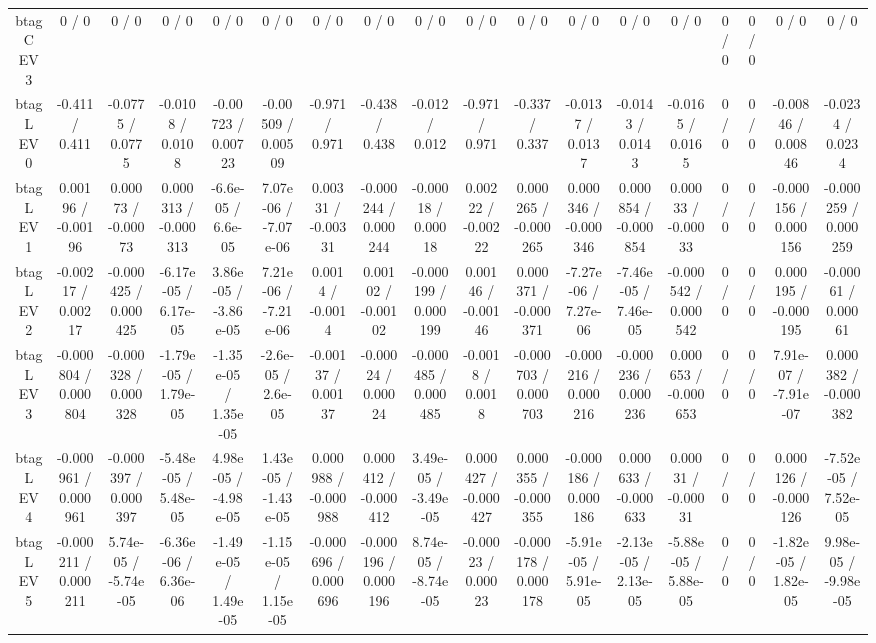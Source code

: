 \documentclass[10pt]{article}
\begin{document}
\begin{table}[htbp]
\begin{center}
\begin{tabular}{|c|c|c|c|c|c|c|c|c|c|c|c|c|c|c|c|c|c|}
  btag C EV 3 & 0 / 0 & 0 / 0 & 0 / 0 & 0 / 0 & 0 / 0 & 0 / 0 & 0 / 0 & 0 / 0 & 0 / 0 & 0 / 0 & 0 / 0 & 0 / 0 & 0 / 0 & 0 / 0 & 0 / 0 & 0 / 0 & 0 / 0 \\ 
  btag L EV 0 & -0.411 / 0.411 & -0.0775 / 0.0775 & -0.0108 / 0.0108 & -0.00723 / 0.00723 & -0.00509 / 0.00509 & -0.971 / 0.971 & -0.438 / 0.438 & -0.012 / 0.012 & -0.971 / 0.971 & -0.337 / 0.337 & -0.0137 / 0.0137 & -0.0143 / 0.0143 & -0.0165 / 0.0165 & 0 / 0 & 0 / 0 & -0.00846 / 0.00846 & -0.0234 / 0.0234 \\ 
  btag L EV 1 & 0.00196 / -0.00196 & 0.00073 / -0.00073 & 0.000313 / -0.000313 & -6.6e-05 / 6.6e-05 & 7.07e-06 / -7.07e-06 & 0.00331 / -0.00331 & -0.000244 / 0.000244 & -0.00018 / 0.00018 & 0.00222 / -0.00222 & 0.000265 / -0.000265 & 0.000346 / -0.000346 & 0.000854 / -0.000854 & 0.00033 / -0.00033 & 0 / 0 & 0 / 0 & -0.000156 / 0.000156 & -0.000259 / 0.000259 \\ 
  btag L EV 2 & -0.00217 / 0.00217 & -0.000425 / 0.000425 & -6.17e-05 / 6.17e-05 & 3.86e-05 / -3.86e-05 & 7.21e-06 / -7.21e-06 & 0.0014 / -0.0014 & 0.00102 / -0.00102 & -0.000199 / 0.000199 & 0.00146 / -0.00146 & 0.000371 / -0.000371 & -7.27e-06 / 7.27e-06 & -7.46e-05 / 7.46e-05 & -0.000542 / 0.000542 & 0 / 0 & 0 / 0 & 0.000195 / -0.000195 & -0.00061 / 0.00061 \\ 
  btag L EV 3 & -0.000804 / 0.000804 & -0.000328 / 0.000328 & -1.79e-05 / 1.79e-05 & -1.35e-05 / 1.35e-05 & -2.6e-05 / 2.6e-05 & -0.00137 / 0.00137 & -0.00024 / 0.00024 & -0.000485 / 0.000485 & -0.0018 / 0.0018 & -0.000703 / 0.000703 & -0.000216 / 0.000216 & -0.000236 / 0.000236 & 0.000653 / -0.000653 & 0 / 0 & 0 / 0 & 7.91e-07 / -7.91e-07 & 0.000382 / -0.000382 \\ 
  btag L EV 4 & -0.000961 / 0.000961 & -0.000397 / 0.000397 & -5.48e-05 / 5.48e-05 & 4.98e-05 / -4.98e-05 & 1.43e-05 / -1.43e-05 & 0.000988 / -0.000988 & 0.000412 / -0.000412 & 3.49e-05 / -3.49e-05 & 0.000427 / -0.000427 & 0.000355 / -0.000355 & -0.000186 / 0.000186 & 0.000633 / -0.000633 & 0.00031 / -0.00031 & 0 / 0 & 0 / 0 & 0.000126 / -0.000126 & -7.52e-05 / 7.52e-05 \\ 
  btag L EV 5 & -0.000211 / 0.000211 & 5.74e-05 / -5.74e-05 & -6.36e-06 / 6.36e-06 & -1.49e-05 / 1.49e-05 & -1.15e-05 / 1.15e-05 & -0.000696 / 0.000696 & -0.000196 / 0.000196 & 8.74e-05 / -8.74e-05 & -0.00023 / 0.00023 & -0.000178 / 0.000178 & -5.91e-05 / 5.91e-05 & -2.13e-05 / 2.13e-05 & -5.88e-05 / 5.88e-05 & 0 / 0 & 0 / 0 & -1.82e-05 / 1.82e-05 & 9.98e-05 / -9.98e-05 \\ 

\end{tabular}
\end{center}
\end{table}
\end{document}
